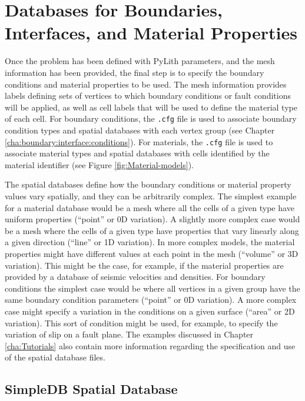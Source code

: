 \section{\label{sec:spatial:databases}Databases for Boundaries, Interfaces,
and Material Properties}

Once the problem has been defined with PyLith parameters, and the
mesh information has been provided, the final step is to specify the
boundary conditions and material properties to be used. The mesh information
provides labels defining sets of vertices to which boundary conditions
or fault conditions will be applied, as well as cell labels that will
be used to define the material type of each cell. For boundary conditions,
the \texttt{.cfg} file is used to associate boundary condition types
and spatial databases with each vertex group (see Chapter \ref{cha:boundary:interface:conditions}).
For materials, the \texttt{.cfg} file is used to associate material
types and spatial databases with cells identified by the material
identifier (see Figure \ref{fig:Material-models}).

The spatial databases define how the boundary conditions or material
property values vary spatially, and they can be arbitrarily complex.
The simplest example for a material database would be a mesh where
all the cells of a given type have uniform properties (``point''
or 0D variation). A slightly more complex case would be a mesh where
the cells of a given type have properties that vary linearly along
a given direction (``line'' or 1D variation). In more complex models,
the material properties might have different values at each point
in the mesh (``volume'' or 3D variation). This might be the case,
for example, if the material properties are provided by a database
of seismic velocities and densities. For boundary conditions the simplest
case would be where all vertices in a given group have the same boundary
condition parameters (``point'' or 0D variation). A more complex
case might specify a variation in the conditions on a given surface
(``area'' or 2D variation). This sort of condition might be used,
for example, to specify the variation of slip on a fault plane. The
examples discussed in Chapter \ref{cha:Tutorials} also contain more
information regarding the specification and use of the spatial database
files.


\subsection{SimpleDB Spatial Database}

